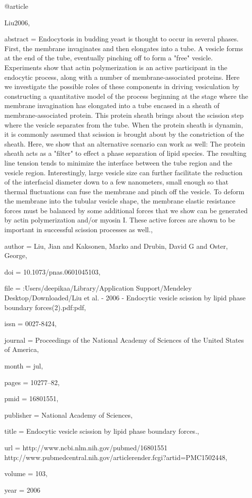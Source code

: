 @article{Liu2006,

abstract = {Endocytosis in budding yeast is thought to occur in several phases. First, the membrane invaginates and then elongates into a tube. A vesicle forms at the end of the tube, eventually pinching off to form a "free" vesicle. Experiments show that actin polymerization is an active participant in the endocytic process, along with a number of membrane-associated proteins. Here we investigate the possible roles of these components in driving vesiculation by constructing a quantitative model of the process beginning at the stage where the membrane invagination has elongated into a tube encased in a sheath of membrane-associated protein. This protein sheath brings about the scission step where the vesicle separates from the tube. When the protein sheath is dynamin, it is commonly assumed that scission is brought about by the constriction of the sheath. Here, we show that an alternative scenario can work as well: The protein sheath acts as a "filter" to effect a phase separation of lipid species. The resulting line tension tends to minimize the interface between the tube region and the vesicle region. Interestingly, large vesicle size can further facilitate the reduction of the interfacial diameter down to a few nanometers, small enough so that thermal fluctuations can fuse the membrane and pinch off the vesicle. To deform the membrane into the tubular vesicle shape, the membrane elastic resistance forces must be balanced by some additional forces that we show can be generated by actin polymerization and/or myosin I. These active forces are shown to be important in successful scission processes as well.},

author = {Liu, Jian and Kaksonen, Marko and Drubin, David G and Oster, George},

doi = {10.1073/pnas.0601045103},

file = {:Users/deepikaa/Library/Application Support/Mendeley Desktop/Downloaded/Liu et al. - 2006 - Endocytic vesicle scission by lipid phase boundary forces(2).pdf:pdf},

issn = {0027-8424},

journal = {Proceedings of the National Academy of Sciences of the United States of America},

month = {jul},

pages = {10277--82},

pmid = {16801551},

publisher = {National Academy of Sciences},

title = {{Endocytic vesicle scission by lipid phase boundary forces.}},

url = {http://www.ncbi.nlm.nih.gov/pubmed/16801551 http://www.pubmedcentral.nih.gov/articlerender.fcgi?artid=PMC1502448},

volume = {103},

year = {2006}

}

